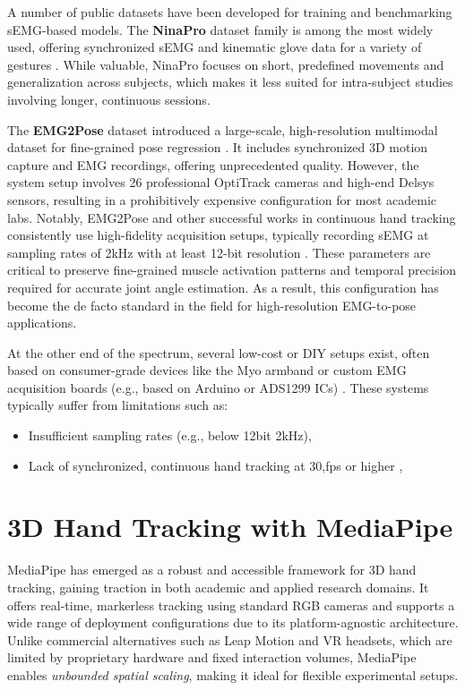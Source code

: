 A number of public datasets have been developed for training and benchmarking sEMG-based models. The \textbf{NinaPro} dataset family is among the most widely used, offering synchronized sEMG and kinematic glove data for a variety of gestures \cite{zia2018multiday}. While valuable, NinaPro focuses on short, predefined movements and generalization across subjects, which makes it less suited for intra-subject studies involving longer, continuous sessions.

The \textbf{EMG2Pose} dataset introduced a large-scale, high-resolution multimodal dataset for fine-grained pose regression \cite{salter2024emg2pose}. It includes synchronized 3D motion capture and EMG recordings, offering unprecedented quality. However, the system setup involves 26 professional OptiTrack cameras and high-end Delsys sensors, resulting in a prohibitively expensive configuration for most academic labs. Notably, EMG2Pose and other successful works in continuous hand tracking consistently use high-fidelity acquisition setups, typically recording sEMG at sampling rates of 2kHz with at least 12-bit resolution \cite{salter2024emg2pose, zanghieri2023semg, lee2022explainable}. These parameters are critical to preserve fine-grained muscle activation patterns and temporal precision required for accurate joint angle estimation. As a result, this configuration has become the de facto standard in the field for high-resolution EMG-to-pose applications.

At the other end of the spectrum, several low-cost or DIY setups exist, often based on consumer-grade devices like the Myo armband or custom EMG acquisition boards (e.g., based on Arduino or ADS1299 ICs) \cite{nasri2020semg}. These systems typically suffer from limitations such as:
\begin{itemize}
    \item Insufficient sampling rates (e.g., below 12bit 2kHz),
    \item Lack of synchronized, continuous hand tracking at 30,fps or higher \cite{graf2023combining},
\end{itemize}

\section{3D Hand Tracking with MediaPipe}

MediaPipe has emerged as a robust and accessible framework for 3D hand tracking, gaining traction in both academic and applied research domains. It offers real-time, markerless tracking using standard RGB cameras and supports a wide range of deployment configurations due to its platform-agnostic architecture. Unlike commercial alternatives such as Leap Motion and VR headsets, which are limited by proprietary hardware and fixed interaction volumes, MediaPipe enables \textit{unbounded spatial scaling}, making it ideal for flexible experimental setups.

